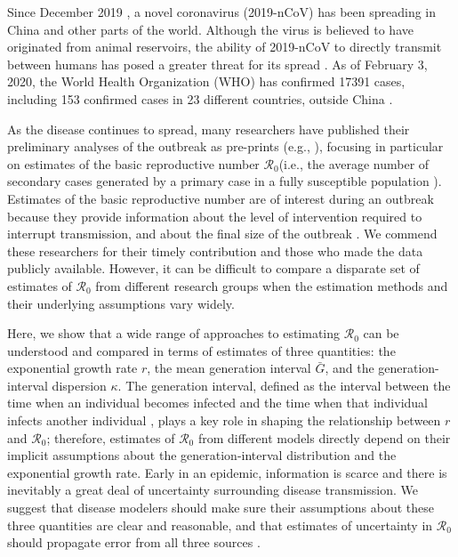 \documentclass[12pt]{article}
\newcommand{\Ro}{\ensuremath{{\mathcal R}_{0}}\xspace}
\begin{document}
Since December 2019 \citep{pneumonia}, a novel coronavirus (2019-nCoV) has been spreading in China and other parts of the world.
Although the virus is believed to have originated from animal reservoirs, the ability of 2019-nCoV to directly transmit between humans has posed a greater threat for its spread \citep{chan2020familial}.
As of February 3, 2020, the World Health Organization (WHO) has confirmed 17391 cases, including 153 confirmed cases in 23 different countries, outside China \citep{who02report}.

As the disease continues to spread, many researchers have published their preliminary analyses of the outbreak as pre-prints (e.g., \cite{bedfordncov, imaincov, liuncov, majumderncov, readncov, zhaoncov}), focusing in particular on estimates of the basic reproductive number \Ro (i.e., the average number of secondary cases generated by a primary case in a fully susceptible population \citep{anderson1991infectious}).
Estimates of the basic reproductive number are of interest during an outbreak because they provide information about the level of intervention required to interrupt transmission, and about the final size of the outbreak \citep{anderson1991infectious}.
We commend these researchers for their timely contribution and those who made the data publicly available.
However, it can be difficult to compare a disparate set of estimates of \Ro from different research groups when the estimation methods and their underlying assumptions vary widely.

Here, we show that a wide range of approaches to estimating \Ro can be understood and compared in terms of estimates of three quantities: the exponential growth rate $r$, the mean generation interval $\bar G$, and the generation-interval dispersion $\kappa$.
The generation interval, defined as the interval between the time when an individual becomes infected and the time when that individual infects another individual \citep{svensson2007note}, plays a key role in shaping the relationship between $r$ and \Ro \citep{wallinga2007generation};
therefore, estimates of \Ro from different models directly depend on their implicit assumptions about the generation-interval distribution and the exponential growth rate.
Early in an epidemic, information is scarce and there is inevitably a great deal of uncertainty surrounding disease transmission.
We suggest that disease modelers should make sure their assumptions about these three quantities are clear and reasonable, and that estimates of uncertainty in \Ro should propagate error from all three sources \citep{elderd2006uncertainty}.
\end{document}
